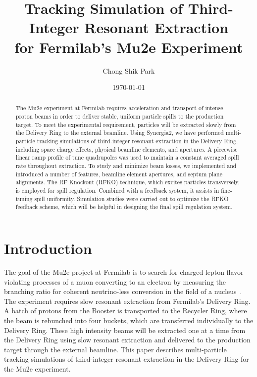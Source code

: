 \documentclass[aps,prstab,showpacs,onecolumn,12pt]{revtex4-1}
\begin{document}
\title{Tracking Simulation of Third-Integer Resonant Extraction \\ for Fermilab's Mu2e Experiment}
\author{Chong Shik Park}
\date{\today}

\begin{abstract}
The Mu2e experiment at Fermilab requires acceleration and transport of intense proton beams in order to deliver stable, uniform particle spills to the production target. To meet the experimental requirement, particles will be extracted slowly from the Delivery Ring to the external beamline. Using Synergia2, we have performed multi-particle tracking simulations of third-integer resonant extraction in the Delivery Ring, including space charge effects, physical beamline elements, and apertures. A piecewise linear ramp profile of tune quadrupoles was used to maintain a constant averaged spill rate throughout extraction. To study and minimize beam losses, we implemented and introduced a number of features, beamline element apertures, and septum plane alignments. The RF Knockout (RFKO) technique, which excites particles transversely, is employed for spill regulation. Combined with a feedback system, it assists in fine-tuning spill uniformity. Simulation studies were carried out to optimize the RFKO feedback scheme, which will be helpful in designing the final spill regulation system.
\end{abstract}

\maketitle

\setcounter{tocdepth}{10}


\section{\label{sec:intro}Introduction}

The goal of the Mu2e project at Fermilab is to search for charged lepton flavor violating processes of a muon converting to an electron by measuring the branching ratio for coherent neutrino-less conversion in the field of a nucleus~\cite{mu2e0, mu2e1}. The experiment requires slow resonant extraction from Fermilab's Delivery Ring. A batch of protons from the Booster is transported to the Recycler Ring, where the beam is rebunched into four buckets, which are transferred individually to the Delivery Ring. These high intensity beams will be extracted one at a time from the Delivery Ring using slow resonant extraction and delivered to the production target through the external beamline. This paper describes multi-particle tracking simulations of third-integer resonant extraction in the Delivery Ring for the Mu2e experiment. 
\end{document}
